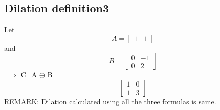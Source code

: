 \documentclass{article}
\begin{document}
     \subsection{Dilation definition3}
     Let \[
    A=
    \begin{bmatrix} 
    1 & 1
    \end{bmatrix}
    \]
     and \[B=\begin{bmatrix} 0 & -1\\
     0 & 2
     \end{bmatrix}
     \]
     $\implies$ C=A $\oplus$ B=
     \[
     \begin{bmatrix}
     1 & 0\\
     1 & 3
     \end{bmatrix}
     \]
     \newline
     REMARK: Dilation calculated using all the three formulas is same.
\end{document}
